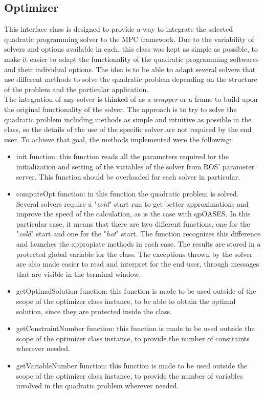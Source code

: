 \subsection{Optimizer}

This interface class is designed to provide a way to integrate the selected quadratic programming solver to the MPC framework. Due to the variability of solvers and options available in each, this class was kept as simple as possible, to make it easier to adapt the functionality of the quadratic programming softwares and their individual options. The idea is to be able to adapt several solvers that use different methods to solve the quadratic problem depending on the structure of the problem and the particular application. \\

The integration of any solver is thinked of as a \emph{wrapper} or a frame to build upon the original functionality of the solver. The approach is to try to solve the quadratic problem including methods as simple and intuitive as possible in the class, so the details of the use of the specific solver are not required by the end user. To achieve that goal, the methods implemented were the following:

\begin{itemize}

\item init function: this function reads all the parameters required for the initialization and setting of the variables of the solver from ROS' parameter server. This function should be overloaded for each solver in particular.

\item computeOpt function: in this function the quadratic problem is solved. Several solvers require a "\emph{cold}" start run to get better approximations and improve the speed of the calculation, as is the case with qpOASES. In this particular case, it means that there are two different functions, one for the "\emph{cold}" start and one for the "\emph{hot}" start. The function recognizes this difference and launches the appropiate methods in each case. The results are stored in a protected global variable for the class. The exceptions thrown by the solver are also made easier to read and interpret for the end user, through messages that are visible in the terminal window.

\item getOptimalSolution function: this function is made to be used outside of the scope of the optimizer class instance, to be able to obtain the optimal solution, since they are protected inside the class.

\item getConstraintNumber function: this function is made to be used outside the scope of the optimizer class instance, to provide the number of constraints wherever needed.

\item getVariableNumber function: this function is made to be used outside the scope of the optimizer class instance, to provide the number of variables involved in the quadratic problem wherever needed.

\end{itemize}  

